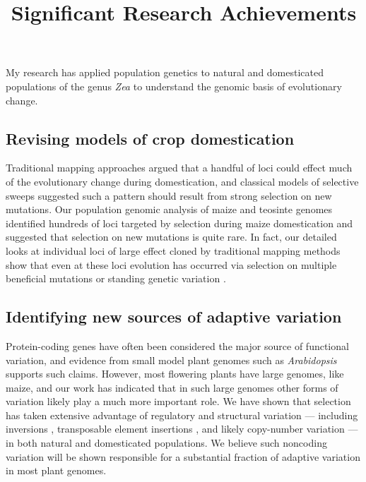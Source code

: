 \documentclass[11pt,letterpaper]{article}
\title{Significant Research Achievements}
\date{}
\begin{document}
\maketitle
\noindent

\noindent My research has applied population genetics to  natural and domesticated populations of the genus \emph{Zea} to understand the genomic basis of evolutionary change.

\subsection*{Revising models of crop domestication}
Traditional mapping approaches argued that a handful of loci could effect much of the evolutionary change during domestication, and classical models of selective sweeps suggested such a pattern should result from strong selection on new mutations. 
Our population genomic analysis of maize and teosinte genomes \citep{hufford2012comparative} identified hundreds of loci targeted by selection during maize domestication and suggested that selection on new mutations is quite rare.
In fact, our detailed looks at individual loci of large effect cloned by traditional mapping methods show that even at these loci evolution has occurred via selection on multiple beneficial mutations \citep{wills2013many} or standing genetic variation \citep{wills2013many, studer2011identification}.

\subsection*{Identifying new sources of adaptive variation}
Protein-coding genes have often been considered the major source of functional variation, and evidence from small model plant genomes such as \emph{Arabidopsis} \citep[e.g.][]{hancock2011adaptation} supports such claims. 
However, most flowering plants have large genomes, like maize, and our work has indicated that in such large genomes other forms of variation likely play a much more important role.  
We have shown that selection has taken extensive advantage of regulatory \citep{swanson2012reshaping,pyhajarvi2013complex} and structural variation --- including inversions \citep{pyhajarvi2013complex,fang2012megabase}, transposable element insertions \citep{studer2011identification,makarevitch2015transposable}, and likely copy-number variation \citep{chia2012maize} --- in both natural and domesticated populations. We believe such noncoding variation will be shown responsible for a substantial fraction of adaptive variation in most plant genomes.


%



\end{document}
